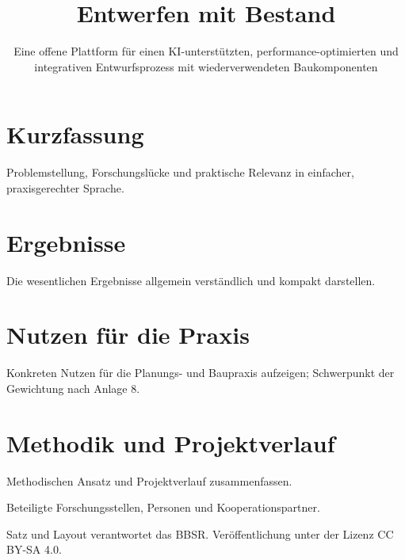 \documentclass[type=kompaktbericht]{zukunftbau}
\title{Entwerfen mit Bestand}
\subtitle{Eine offene Plattform für einen KI-unterstützten, performance-optimierten und integrativen Entwurfsprozess mit wiederverwendeten Baukomponenten}
\begin{document}
\makecoverpages

\makefundingacknowledgement

\makemainmatter


\section*{Kurzfassung}
Problemstellung, Forschungslücke und praktische Relevanz in einfacher, praxisgerechter Sprache.

\section{Ergebnisse}
\label{kompakt:ergebnisse}
Die wesentlichen Ergebnisse allgemein verständlich und kompakt darstellen.

\section{Nutzen für die Praxis}
\label{kompakt:nutzen}
Konkreten Nutzen für die Planungs- und Baupraxis aufzeigen; Schwerpunkt der Gewichtung nach Anlage 8.

\section{Methodik und Projektverlauf}
\label{kompakt:methodik}
Methodischen Ansatz und Projektverlauf zusammenfassen.

\makeappendices

Beteiligte Forschungsstellen, Personen und Kooperationspartner.

\SemioReferences

Satz und Layout verantwortet das BBSR. Veröffentlichung unter der Lizenz CC BY-SA 4.0.
\end{document}
